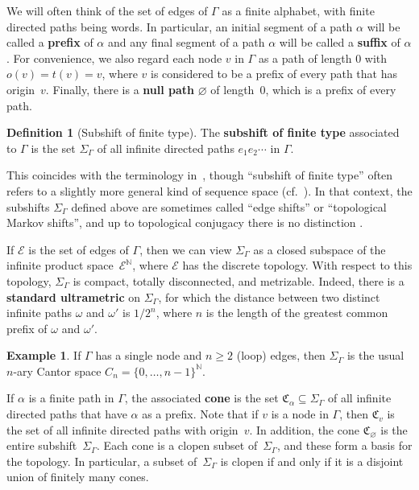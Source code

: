 \documentclass[11pt,letterpaper]{amsart}
\theoremstyle{definition}
\newtheorem{definition}[theorem]{Definition}
\newtheorem{example}[theorem]{Example}
\newcommand{\newword}[1]{\textbf{#1}}
\newcommand{\N}{\mathbb{N}}
\newcommand{\C}{\mathfrak{C}}
\begin{document}
We will often think of the set of edges of $\Gamma$ as a finite alphabet, with finite directed paths being words.  In particular, an initial segment of a path $\alpha$ will be called a \newword{prefix} of $\alpha$ and any final segment of a path $\alpha$ will be called a \newword{suffix} of $\alpha$. For convenience, we also regard each node $v$ in $\Gamma$ as a path of length $0$ with $o(v)=t(v)=v$, where $v$ is considered to be a prefix of every path that has origin~$v$.  Finally, there is a \newword{null path} $\varnothing$ of length~$0$, which is a prefix of every path.

\begin{definition}[Subshift of finite type]
The \newword{subshift of finite type} associated to $\Gamma$ is the set $\Sigma_\Gamma$ of all infinite directed paths $e_1e_2 \cdots$ in $\Gamma$.
\end{definition}

This coincides with the terminology in~\cite{Matui15}, though ``subshift of finite type'' often refers to a slightly more general kind of sequence space (cf.\ \cite[Definition~2.1.1]{LindMarcus}). In that context, the subshifts $\Sigma_\Gamma$ defined above are sometimes called ``edge shifts'' or ``topological Markov shifts'', and up to topological conjugacy there is no distinction \cite{LindMarcus}.

If $\mathcal{E}$  is the set of edges of $\Gamma$, then we can view $\Sigma_\Gamma$ as a closed subspace of the infinite product space~$\mathcal{E}^{\N}$, where $\mathcal{E}$ has the discrete topology. With respect to this topology, $\Sigma_\Gamma$ is compact, totally disconnected, and metrizable.  Indeed, there is a \newword{standard ultrametric} on $\Sigma_\Gamma$, for which the distance between two distinct infinite paths $\omega$ and $\omega'$ is $1/2^n$, where $n$ is the length of the greatest common prefix of $\omega$ and $\omega'$.

\begin{example}
If $\Gamma$ has a single node and $n\ge 2$ (loop) edges, then $\Sigma_\Gamma$ is the usual $n$-ary Cantor space $C_n=\{0,\dots,n-1\}^\N$.
\end{example}

If $\alpha$ is a finite path in $\Gamma$, the associated \newword{cone} is the set $\C_\alpha\subseteq \Sigma_\Gamma$ of all infinite directed paths that have $\alpha$ as a prefix.  Note that if $v$ is a node in $\Gamma$, then $\C_v$ is the set of all infinite directed paths with origin~$v$. In addition, the cone $\C_\varnothing$ is the entire subshift~$\Sigma_\Gamma$. Each cone is a clopen subset of~$\Sigma_\Gamma$, and these form a basis for the topology.  In particular, a subset of~$\Sigma_\Gamma$ is clopen if and only if it is a disjoint union of finitely many cones.
\end{document}
